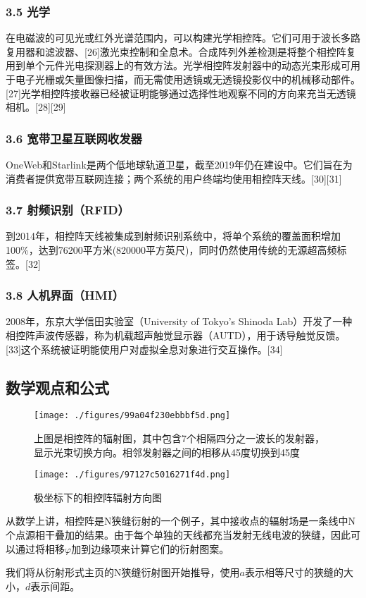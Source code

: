 \subsubsection{3.5 光学}
在电磁波的可见光或红外光谱范围内，可以构建光学相控阵。它们可用于波长多路复用器和滤波器、[26]激光束控制和全息术。合成阵列外差检测是将整个相控阵复用到单个元件光电探测器上的有效方法。光学相控阵发射器中的动态光束形成可用于电子光栅或矢量图像扫描，而无需使用透镜或无透镜投影仪中的机械移动部件。[27]光学相控阵接收器已经被证明能够通过选择性地观察不同的方向来充当无透镜相机。[28][29]

\subsubsection{3.6 宽带卫星互联网收发器}
OneWeb和Starlink是两个低地球轨道卫星，截至2019年仍在建设中。它们旨在为消费者提供宽带互联网连接；两个系统的用户终端均使用相控阵天线。[30][31]

\subsubsection{3.7 射频识别（RFID）}
到2014年，相控阵天线被集成到射频识别系统中，将单个系统的覆盖面积增加100\%，达到76200平方米(820000平方英尺)，同时仍然使用传统的无源超高频标签。[32]

\subsubsection{3.8 人机界面（HMI）}
2008年，东京大学信田实验室（University of Tokyo's Shinoda Lab）开发了一种相控阵声波传感器，称为机载超声触觉显示器（AUTD），用于诱导触觉反馈。[33]这个系统被证明能使用户对虚拟全息对象进行交互操作。[34]

\subsection{数学观点和公式}
\begin{figure}[ht]
\centering
\texttt{[image: ./figures/99a04f230ebbbf5d.png]}
\caption{上图是相控阵的辐射图，其中包含7个相隔四分之一波长的发射器，显示光束切换方向。相邻发射器之间的相移从45度切换到45度} \label{fig_XKZ_10}
\end{figure}
\begin{figure}[ht]
\centering
\texttt{[image: ./figures/97127c5016271f4d.png]}
\caption{极坐标下的相控阵辐射方向图} \label{fig_XKZ_11}
\end{figure}

从数学上讲，相控阵是N狭缝衍射的一个例子，其中接收点的辐射场是一条线中N个点源相干叠加的结果。由于每个单独的天线都充当发射无线电波的狭缝，因此可以通过将相移$\varphi$加到边缘项来计算它们的衍射图案。

我们将从衍射形式主页的N狭缝衍射图开始推导，使用$a$表示相等尺寸的狭缝的大小，$d$表示间距。